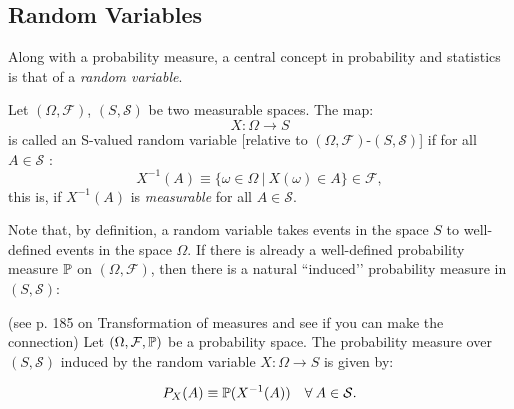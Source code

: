 \documentclass[11pt]{article} %
\begin{document}
%

\subsection{Random Variables}

Along with a probability measure, a central concept in probability and statistics is that of a \emph{random variable}.

\begin{definition}
Let $(\Omega, \mathcal{F})$, $(S, \mathcal{S})$ be two measurable spaces. The map:
$$X: \Omega \rightarrow S$$
\noindent is called an S-valued random variable [relative to $(\Omega, \mathcal{F})$-$(S, \mathcal{S})$] if for all $A \in \mathcal{S}$  :
$$X^{-1}(A) \equiv \{\omega \in \Omega \: | \: X(\omega) \in A\} \in \mathcal{F},$$
\noindent this is, if $X^{-1}(A)$ is \emph{measurable} for all $A \in \mathcal{S}$.   
\end{definition} 

Note that, by definition, a random variable takes events in the space $S$ to well-defined events in the space $\Omega$. If there is already a well-defined probability measure $\mathbb{P}$ on $(\Omega, \mathcal{F})$, then there is a natural ``induced’’ probability measure in $(S, \mathcal{S})$:

\begin{definition} (see \cite{Billingsley95} p. 185 on Transformation of measures and see if you can make the connection) Let $(\Omega, \mathcal{F}, \mathbb{P})$ be a probability space. The probability measure over $(S, \mathcal{S})$ induced by the random variable $X: \Omega \rightarrow S$ is given by:

$$P_{X}(A) \equiv \mathbb{P}(X^{-1}(A)) \quad \forall \: A \in \mathcal{S}.$$

\end{definition}
\end{document}
